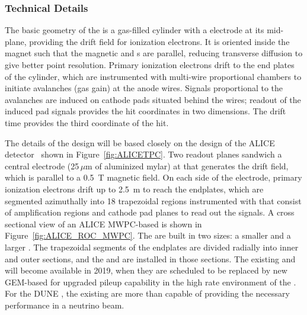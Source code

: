 
\subsubsection{ Technical Details}
The basic geometry of the  is a gas-filled cylinder with a  electrode at its mid-plane, providing the drift field for ionization electrons. It is oriented inside the magnet such that the magnetic and \efield{}s are parallel, reducing transverse diffusion to give better point resolution. Primary ionization electrons drift to the end plates of the cylinder, which are instrumented with multi-wire proportional chambers to initiate avalanches (gas gain) at the anode wires.  Signals proportional to the avalanches are induced on cathode pads situated behind the wires; readout of the induced pad signals provides the hit coordinates in two dimensions.  The drift time provides the third coordinate of the hit.

The details of the  design will be based closely on the design of the ALICE detector~\cite{Dellacasa:2000bm} shown in Figure~\ref{fig:ALICETPC}. Two readout planes sandwich a central  electrode (25$\,\mu$m of aluminized mylar) at  that generates the drift field, which is parallel to a \SI{0.5}{T} magnetic field. On each side of the electrode, primary ionization electrons drift up to \SI{2.5}{m} to reach the endplates, which are segmented azimuthally into 18 trapezoidal regions instrumented with  that consist of  amplification regions and cathode pad planes to read out the signals. A cross sectional view of an ALICE MWPC-based  is shown in Figure~\ref{fig:ALICE_ROC_MWPC}. The  are built in two sizes: a smaller  and a larger . The trapezoidal segments of the endplates are divided radially into inner and outer sections, and the  and  are installed in those sections. The existing  and  will become available in 2019, when they are scheduled to be replaced by new GEM-based  for upgraded pileup capability in the high rate environment of the . For the DUNE , the existing  are more than capable of providing the necessary performance in a neutrino beam.  


